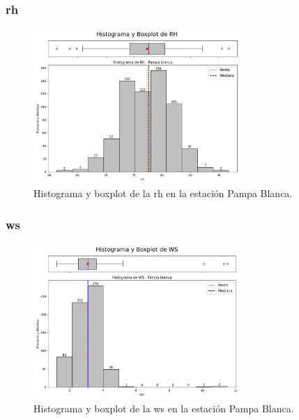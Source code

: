 \subsubsection*{\gls{rh} }
\begin{figure}[htbp]
\centering
\includegraphics[width=0.7\textwidth]{resultados/por_estacion_meteorologica/Pampa_Blanca/RH_histograma.png}
\caption{Histograma y boxplot de la \gls{rh}  en la estación Pampa Blanca.}
\label{fig:pampablanca_RH}
\end{figure}

\subsubsection*{\gls{ws} }
\begin{figure}[htbp]
\centering
\includegraphics[width=0.7\textwidth]{resultados/por_estacion_meteorologica/Pampa_Blanca/WS_histograma.png}
\caption{Histograma y boxplot de la \gls{ws}  en la estación Pampa Blanca.}
\label{fig:pampablanca_WS}
\end{figure}

